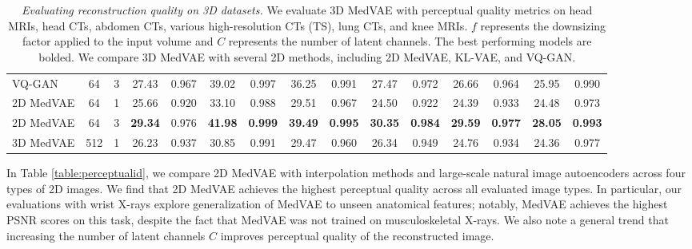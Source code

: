 \begin{table*}[t]
{\begin{tabular}{lcccccccccccccc}
\small VQ-GAN & 64 & 3 & 27.43 & 0.967 & 39.02 & 0.997 & 36.25 & 0.991 & 27.47 & 0.972 & 26.66 & 0.964 & 25.95 & 0.990 \\
\small 2D MedVAE  & 64 & 1 & 25.66 & 0.920 & 33.10 & 0.988 & 29.51 & 0.967  & 24.50 & 0.922 & 24.39 & 0.933 & 24.48 & 0.973 \\
\small 2D MedVAE  & 64 & 3 & {\textbf{29.34}} & 0.976 & {\textbf{41.98}} & {\textbf{0.999}} & {\textbf{39.49}} & {\textbf{0.995}} & {\textbf{30.35}} & {\textbf{0.984}} & {\textbf{29.59}} & {\textbf{0.977}} & {\textbf{28.05}} & {\textbf{0.993}} \\
\small 3D MedVAE  & 512 & 1 & 26.23 & 0.937 & 30.85 & 0.991 & 29.47 & 0.960 & 26.34 & 0.949 & 24.76 & 0.934 & 24.36 & 0.977 \\

\bottomrule
\end{tabular}
}
\caption{\textit{Evaluating reconstruction quality on 3D datasets.} We evaluate 3D MedVAE with perceptual quality metrics on head MRIs, head CTs, abdomen CTs, various high-resolution CTs (TS), lung CTs, and knee MRIs. $f$ represents the downsizing factor applied to the input volume and $C$ represents the number of latent channels. The best performing models are bolded. We compare 3D MedVAE with several 2D methods, including 2D MedVAE, KL-VAE, and VQ-GAN.}
\label{table:3dperceptual}
\end{table*}


In Table \ref{table:perceptualid}, we compare 2D MedVAE with interpolation methods and large-scale natural image autoencoders across four types of 2D images. We find that 2D MedVAE achieves the highest perceptual quality across all evaluated image types. In particular, our evaluations with wrist X-rays explore generalization of MedVAE to unseen anatomical features; notably, MedVAE achieves the highest PSNR scores on this task, despite the fact that MedVAE was not trained on musculoskeletal X-rays. We also note a general trend that increasing the number of latent channels $C$ improves perceptual quality of the reconstructed image. 

